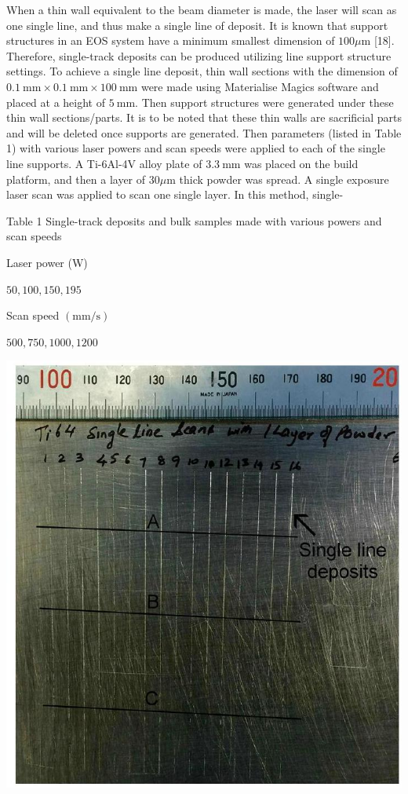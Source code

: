 \documentclass[10pt]{article}
\begin{document}
When a thin wall equivalent to the beam diameter is made, the laser will scan as one single line, and thus make a single line of deposit. It is known that support structures in an EOS system have a minimum smallest dimension of $100 \mu \mathrm{m}$ [18]. Therefore, single-track deposits can be produced utilizing line support structure settings. To achieve a single line deposit, thin wall sections with the dimension of $0.1 \mathrm{~mm} \times 0.1 \mathrm{~mm} \times 100 \mathrm{~mm}$ were made using Materialise Magics software and placed at a height of $5 \mathrm{~mm}$. Then support structures were generated under these thin wall sections/parts. It is to be noted that these thin walls are sacrificial parts and will be deleted once supports are generated. Then parameters (listed in Table 1) with various laser powers and scan speeds were applied to each of the single line supports. A Ti-6Al-4V alloy plate of $3.3 \mathrm{~mm}$ was placed on the build platform, and then a layer of $30 \mu \mathrm{m}$ thick powder was spread. A single exposure laser scan was applied to scan one single layer. In this method, single-

Table 1 Single-track deposits and bulk samples made with various powers and scan speeds

Laser power (W)

$50,100,150,195$

Scan speed $(\mathrm{mm} / \mathrm{s})$

$500,750,1000,1200$

\begin{center}
\includegraphics[max width=\textwidth]{2024_02_28_5b6806184856c64a957ag-03}
\end{center}
\end{document}
